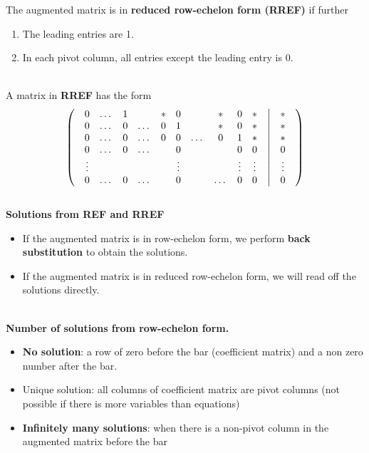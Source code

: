 \documentclass[11pt]{article}
\begin{document}
{The augmented matrix is in \textbf{reduced row-echelon form (RREF)} if further
\begin{enumerate}
\item The leading entries are 1.
\item In each pivot column, all entries except the leading entry is 0.
\end{enumerate}
\;\\ A matrix in \textbf{RREF} has the form
\[
\left(\q
\begin{matrix}{}
0      & \dots & 1 &     \ & *  & 0 & \ & * & 0 & * \\
0      & \dots & 0 & \dots & 0  & 1 & \ & * & 0 & * \\
0      & \dots & 0 & \dots & 0  & 0 & \dots & 0 & 1 & * \\
0      & \dots & 0 & \dots & \  & 0 & \ & \ & 0 & 0 \\
\vdots & \     & \ & \     & \  & \vdots & \ & \ & \vdots & \vdots \\
0      & \dots & 0 & \dots & \  & 0 & \ & \dots & 0 & 0 \\
\end{matrix}
\q\middle|\q
\begin{matrix}
* \\ * \\ * \\ 0\\ \vdots \\ 0
\end{matrix}\q
\right)
\]
\;\\
\textbf{Solutions from REF and RREF}
\begin{itemize}
\item If the augmented matrix is in row-echelon form, we perform \textbf{back substitution} to obtain the solutions.
\item If the augmented matrix is in reduced row-echelon form, we will read off the solutions directly. 
\end{itemize}\;\\
\textbf{Number of solutions from row-echelon form.}
\begin{itemize}
\item \textbf{No solution}: a row of zero before the bar (coefficient matrix) and a non zero number after the bar.
\item Unique solution: all columns of coefficient matrix are pivot columns (not possible if there is more variables than equations)
\item \textbf{Infinitely many solutions}: when there is a non-pivot column in the augmented matrix before the bar
\end{itemize}
}
\end{document}
